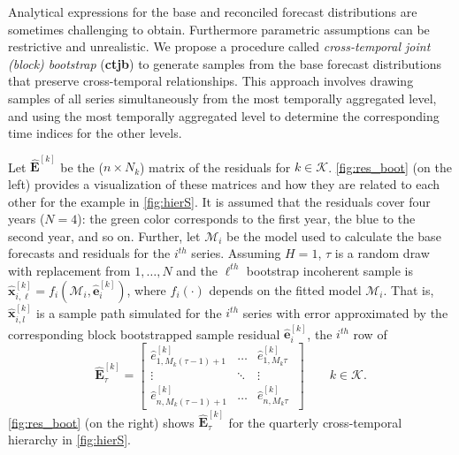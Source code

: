 \documentclass[review, 11pt]{elsarticle}
\newcommand{\evet}{\bm{e}}
\newcommand{\xvet}{\bm{x}}
\newcommand{\Evet}{\bm{E}}
\theoremstyle{definition}
\begin{document}
Analytical expressions for the base and reconciled forecast distributions are sometimes challenging to obtain. Furthermore parametric assumptions can be restrictive and unrealistic. We propose a procedure called \textit{cross-temporal joint (block) bootstrap} (\textbf{ctjb}) to generate samples from the base forecast distributions that preserve cross-temporal relationships. This approach involves drawing samples of all series simultaneously from the most temporally aggregated level, and using the most temporally aggregated level to determine the corresponding time indices for the other levels.

Let $\widehat{\Evet}^{[k]}$ be the ($n \times N_k$) matrix of the residuals for $k \in \mathcal{K}$. \autoref{fig:res_boot} (on the left) provides a visualization of these matrices and how they are related to each other for the example in \autoref{fig:hierS}. It is assumed that the residuals cover four years ($N=4$): the green color corresponds to the first year, the blue to the second year, and so on. Further, let $\mathcal{M}_i$ be the model used to calculate the base forecasts and residuals for the $i^{th}$ series. %
Assuming $H = 1$, $\tau$ is a random draw with replacement from $1,\dots, N$ and the $\ell^{th}$ bootstrap incoherent sample is
$\widehat{\xvet}_{i,\ell}^{[k]} = f_i(\mathcal{M}_i, \widehat{\evet}_{i}^{[k]})$,
where $f_i(\cdot)$ depends on the fitted %
model $\mathcal{M}_i$. That is, $\widehat{\xvet}_{i,l}^{[k]}$ is a sample path simulated for the $i^{th}$ series with error approximated by the corresponding block bootstrapped sample residual $\widehat{\evet}_{i}^{[k]}$, the $i^{th}$ row of
$$
	\widehat{\Evet}^{[k]}_{\tau} = \begin{bmatrix}
		\widehat{e}^{[k]}_{1,M_k(\tau-1)+1} & \dots  & \widehat{e}^{[k]}_{1,M_k\tau}   \\[-0.25cm]
		\vdots                              & \ddots & \vdots                          \\[-0.25cm]
		\widehat{e}^{[k]}_{n,M_k(\tau-1)+1} & \dots  & \widehat{e}^{[k]}_{n,M_k\tau} \
	\end{bmatrix}\qquad k \in \mathcal{K}.
$$
\autoref{fig:res_boot} (on the right) shows $\widehat{\Evet}^{[k]}_{\tau}$ for the quarterly cross-temporal hierarchy in \autoref{fig:hierS}.


\end{document}
